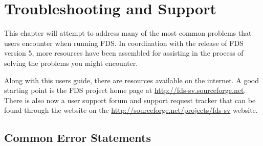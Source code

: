 \documentclass[11pt]{book}
\begin{document}
\chapter{Troubleshooting and Support}%

\label{info:Support}

This chapter will attempt to address many of the most common problems that users
encounter when running FDS.  In coordination with the release of FDS version 5,
more resources have been assembled for assisting in the process of solving the
problems you might encounter.

Along with this users guide, there are resources
available on the internet. A good starting point is the FDS project home page at
\href{http://fds-sv.sourceforge.net}{{\ct http://fds-sv.sourceforge.net}}.  There is also
now a user support forum and support request tracker that can be found through the website on the
\href{http://sourceforge.net/projects/fds-sv}{{\ct http://sourceforge.net/projects/fds-sv}} website.

\section{Common Error Statements}%
\end{document}
